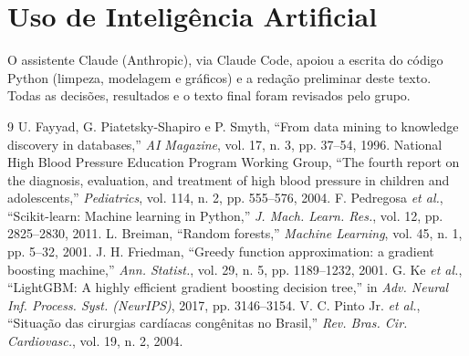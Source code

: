 \documentclass[conference]{IEEEtran}
\begin{document}
\section*{Uso de Inteligência Artificial}
O assistente Claude (Anthropic), via Claude Code, apoiou a escrita do código Python (limpeza, modelagem e gráficos) e a redação preliminar deste texto. Todas as decisões, resultados e o texto final foram revisados pelo grupo.

\begin{thebibliography}{9}
 U. Fayyad, G. Piatetsky-Shapiro e P. Smyth, ``From data mining to knowledge discovery in databases,'' \emph{AI Magazine}, vol. 17, n. 3, pp. 37--54, 1996.
 National High Blood Pressure Education Program Working Group, ``The fourth report on the diagnosis, evaluation, and treatment of high blood pressure in children and adolescents,'' \emph{Pediatrics}, vol. 114, n. 2, pp. 555--576, 2004.
 F. Pedregosa \emph{et al.}, ``Scikit-learn: Machine learning in Python,'' \emph{J. Mach. Learn. Res.}, vol. 12, pp. 2825--2830, 2011.
 L. Breiman, ``Random forests,'' \emph{Machine Learning}, vol. 45, n. 1, pp. 5--32, 2001.
 J. H. Friedman, ``Greedy function approximation: a gradient boosting machine,'' \emph{Ann. Statist.}, vol. 29, n. 5, pp. 1189--1232, 2001.
 G. Ke \emph{et al.}, ``LightGBM: A highly efficient gradient boosting decision tree,'' in \emph{Adv. Neural Inf. Process. Syst. (NeurIPS)}, 2017, pp. 3146--3154.
 V. C. Pinto Jr. \emph{et al.}, ``Situação das cirurgias cardíacas congênitas no Brasil,'' \emph{Rev. Bras. Cir. Cardiovasc.}, vol. 19, n. 2, 2004.
\end{thebibliography}
\end{document}
